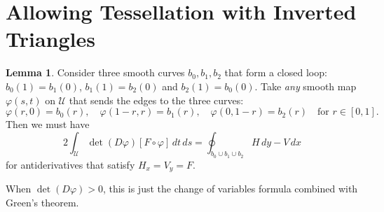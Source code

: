 \documentclass[letterpaper,10pt]{article}
\theoremstyle{definition}
\newtheorem{lemma}{Lemma}[section]
\newcommand{\utri}{\mathcal{U}}
\begin{document}
\section{Allowing Tessellation with Inverted Triangles}

\begin{lemma}\label{lemma:bad-triangle}
Consider three smooth curves
\(b_0, b_1, b_2\) that form a closed loop: \(b_0(1) = b_1(0)\),
\(b_1(1) = b_2(0)\) and \(b_2(1) = b_0(0)\).
Take \emph{any} smooth map \(\varphi(s, t)\) on \(\utri\) that
sends the edges to the three curves:
\begin{equation}
\varphi(r, 0) = b_0(r), \quad \varphi(1 - r, r) = b_1(r),
  \quad \varphi(0, 1 - r) = b_2(r) \quad \text{for } r \in \left[0, 1\right].
\end{equation}
Then we must have
\begin{equation}
2 \int_{\utri} \det(D\varphi) \left[F \circ \varphi\right] \, dt \, ds =
\oint_{b_0 \cup b_1 \cup b_2} H \, dy - V \, dx
\end{equation}
for antiderivatives that satisfy \(H_x = V_y = F\).

When \(\det(D\varphi) > 0\), this is just the change of variables
formula combined with Green's theorem.
\end{lemma}
\end{document}
